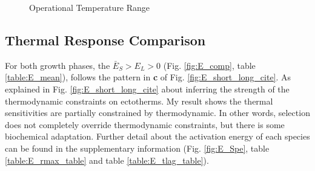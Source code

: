 \documentclass[a4paper]{article}
\begin{document}
\begin{figure}[ht!]
\begin{subfigure}{.47\textwidth}
      \caption{}
      \label{fig:log_mean_1tlag_temp}
    \end{subfigure}
\caption{Operational Temperature Range}\label{fig:rate_temp}
\end{figure}


\subsection{Thermal Response Comparison}

For both growth phases, the $\bar{E}_{S} > E_L > 0$ (Fig. \ref{fig:E_comp}, table \ref{table:E_mean}), follows the pattern in \textbf{c} of Fig. \ref{fig:E_short_long_cite}. As explained in Fig. \ref{fig:E_short_long_cite} about inferring the strength of the thermodynamic constraints on ectotherms. My result shows the thermal sensitivities are partially constrained by thermodynamic. In other words, selection does not completely override thermodynamic constraints, but there is some biochemical adaptation. Further detail about the activation energy of each species can be found in the supplementary information (Fig. \ref{fig:E_Spe}, table \ref{table:E_rmax_table} and table \ref{table:E_tlag_table}). \\
\end{document}
